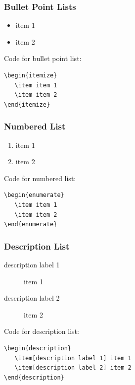 \documentclass{pharmrep}
\begin{document}
\subsubsection{Bullet Point Lists}
\begin{itemize}
   \item item 1
   \item item 2
\end{itemize}

Code for bullet point list:
\begin{verbatim}
\begin{itemize}
   \item item 1
   \item item 2
\end{itemize}
\end{verbatim}

\subsubsection{Numbered List}
\begin{enumerate}
   \item item 1
   \item item 2
\end{enumerate}

Code for numbered list:
\begin{verbatim}
\begin{enumerate}
   \item item 1
   \item item 2
\end{enumerate}
\end{verbatim}

\subsubsection{Description List}
\begin{description}
   \item[description label 1] item 1
   \item[description label 2] item 2
\end{description}

Code for description list:
\begin{verbatim}
\begin{description}
   \item[description label 1] item 1
   \item[description label 2] item 2
\end{description}
\end{verbatim}
\end{document}
